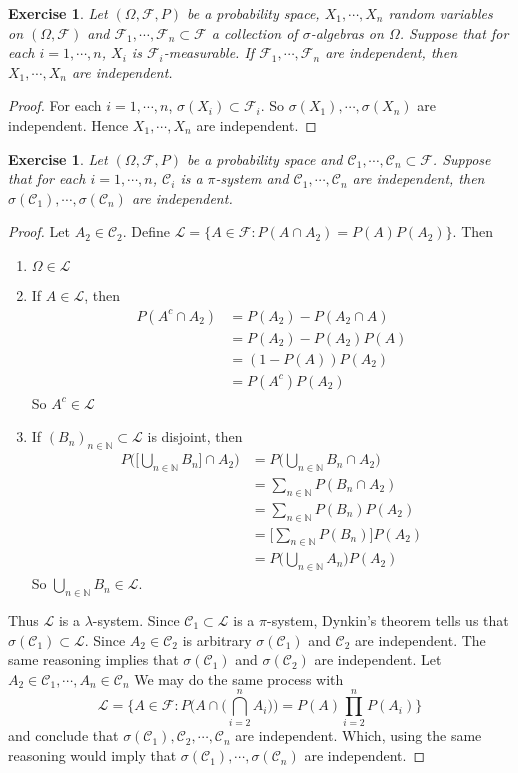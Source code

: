 \documentclass[12pt]{amsart}
\newtheorem{ex}[thm]{Exercise}
\newcommand{\lam}{\lambda}
\newcommand{\sig}{\sigma}
\newcommand{\Om}{\Omega}
\newcommand{\N}{\mathbb{N}}
\newcommand{\MC}{\mathcal{C}}
\newcommand{\MF}{\mathcal{F}}
\newcommand{\ML}{\mathcal{L}}
\begin{document}
\begin{ex}
Let $(\Om, \MF, P)$ be a probability space, $X_1, \cdots, X_n$ random variables on $(\Om, \MF)$ and $\MF_1, \cdots, \MF_n \subset \MF$ a collection of $\sig$-algebras on $\Om$. Suppose that for each $i = 1, \cdots, n$, $X_i$ is $\MF_i$-measurable. If $\MF_1, \cdots, \MF_n$ are independent, then $X_1, \cdots, X_n$ are independent. 
\end{ex}

\begin{proof}
For each $i =1, \cdots, n$, $\sig(X_i) \subset \MF_i$. So $\sig(X_1), \cdots, \sig(X_n)$ are independent. Hence $X_1, \cdots, X_n$ are independent.
\end{proof}

\begin{ex}
Let $(\Om, \MF, P)$ be a probability space and $\MC_1, \cdots, \MC_n \subset \MF$. Suppose that for each $i = 1, \cdots, n$, $\MC_i$ is a $\pi$-system and $\MC_1, \cdots, \MC_n$ are independent, then $\sig(\MC_1), \cdots, \sig(\MC_n)$ are independent.
\end{ex}

\begin{proof}
Let $A_2 \in \MC_2$. Define $\ML = \{A \in \MF: P(A\cap A_2) = P(A)P(A_2)\}$. Then 
\begin{enumerate}
\item $\Om \in \ML$
\item If $A \in \ML$, then 
\begin{align*}
P(A^c \cap A_2) 
&= P(A_2) - P(A_2 \cap A) \\
&= P(A_2) - P(A_2) P(A) \\
&= (1- P(A))P(A_2) \\
&= P(A^c)P(A_2)
\end{align*}
So $A^c \in \ML$
\item If $(B_n)_{n \in \N} \subset \ML$ is disjoint, then 
\begin{align*}
P\bigg( \bigg[\bigcup_{n \in \N}B_n \bigg] \cap A_2\bigg) 
&= P \bigg( \bigcup_{n \in \N}B_n \cap A_2 \bigg) \\
&= \sum_{n \in \N}P(B_n \cap A_2) \\
&= \sum_{n \in \N}P(B_n) P(A_2) \\
&=   \bigg[\sum_{n \in \N}P(B_n)\bigg]P(A_2)  \\
&=  P\bigg( \bigcup_{n \in \N} A_n\bigg) P(A_2) 
\end{align*} 
So $\bigcup\limits_{n \in \N}B_n \in \ML$. 
\end{enumerate}
Thus $\ML$ is a $\lam$-system. Since $\MC_1 \subset \ML$ is a $\pi$-system, Dynkin's theorem tells us that $\sig(\MC_1) \subset \ML$. Since $A_2 \in \MC_2$ is arbitrary $\sig(\MC_1)$ and $\MC_2$ are independent. The same reasoning implies that $\sig(\MC_1)$ and $\sig(\MC_2)$ are independent. Let $A_2 \in \MC_1, \cdots, A_n \in \MC_n$ We may do the same process with $$\ML = \bigg \{A \in \MF: P\bigg(A \cap \bigg(\bigcap_{i=2}^n A_i\bigg) \bigg) = P(A)\prod_{i=2}^n P(A_i)\bigg\}$$ and conclude that $\sig(\MC_1), \MC_2, \cdots, \MC_n$ are independent. Which, using the same reasoning would imply that $\sig(\MC_1), \cdots, \sig(\MC_n)$ are independent.
\end{proof}
\end{document}
